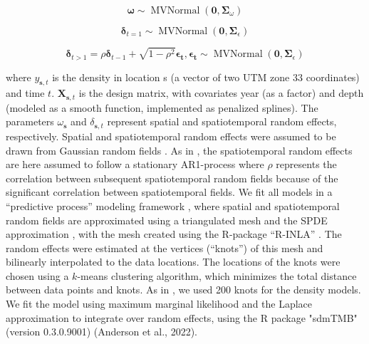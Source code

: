\documentclass[9pt,twoside,lineno]{pnas-new}
\begin{document}
\begin{equation}
    \label{eq:si_spatiotemporal3}
    \boldsymbol{\omega} \sim \operatorname{MVNormal} (\boldsymbol{0},\boldsymbol{\Sigma}_\omega)
\end{equation}

\begin{equation}
    \label{eq:si_spatiotemporal4}
    \boldsymbol{\delta}_{t=1} \sim \operatorname{MVNormal} (\boldsymbol{0}, \boldsymbol{\Sigma}_{\epsilon})
\end{equation}

\begin{equation}
    \label{eq:si_spatiotemporal5}
        \boldsymbol{\delta}_{t>1} = \rho \boldsymbol{\delta}_{t-1} + \sqrt{1 - \rho^2} \boldsymbol{\epsilon_{t}}, \boldsymbol{\epsilon_{t}} \sim \operatorname{MVNormal}(\boldsymbol{0}, \boldsymbol{\Sigma}_{\epsilon})
\end{equation}

where $y_{\boldsymbol{s}, t}$ is the density in location s (a vector of two UTM zone 33 coordinates) and time $t$. $\boldsymbol{X}_{\boldsymbol{s}, t}$ is the design matrix, with covariates year (as a factor) and depth (modeled as a smooth function, implemented as penalized splines). The parameters $\omega_{\boldsymbol{s}}$ and $\delta_{\boldsymbol{s}, t}$ represent spatial and spatiotemporal random effects, respectively. Spatial and spatiotemporal random effects were assumed to be drawn from Gaussian random fields \citep{lindgrenExplicitLinkGaussian2011, cressieStatisticsSpatioTemporalData2015}. As in \cite{Lindmark2023}, the spatiotemporal random effects are here assumed to follow a stationary AR1-process where $\rho$ represents the correlation between subsequent spatiotemporal random fields because of the significant correlation between spatiotemporal fields. We fit all models in a “predictive process” modeling framework \citep{latimerHierarchicalModelsFacilitate2009, andersonSdmTMBPackageFast2022}, where spatial and spatiotemporal random fields are approximated using a triangulated mesh and the SPDE approximation \citep{lindgrenExplicitLinkGaussian2011}, with the mesh created using the R-package “R-INLA” \citep{rueApproximateBayesianInference2009}. The random effects were estimated at the vertices (“knots”) of this mesh and bilinearly interpolated to the data locations. The locations of the knots were chosen using a $k$-means clustering algorithm, which minimizes the total distance between data points and knots. As in \cite{Lindmark2023}, we used 200 knots for the density models. We fit the model using maximum marginal likelihood and the Laplace approximation to integrate over random effects, using the R package "sdmTMB" (version 0.3.0.9001) (Anderson et al., 2022). 
\end{document}
